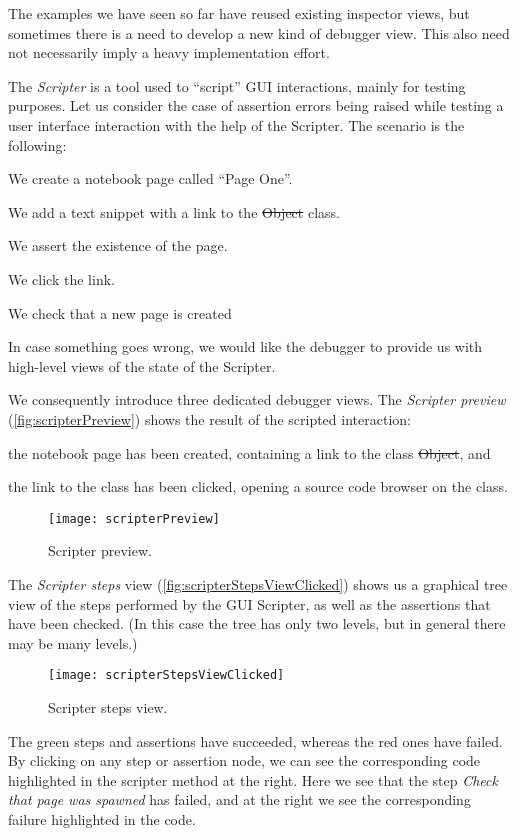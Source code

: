 \documentclass[sigplan,10pt]{acmart}
\newcommand\on[1]{\nbc{ON}{#1}{olive}} %
\newcommand{\GT}{\lst{GT}\xspace} %
\begin{document}
\on{Not sure what is needed.}

The examples we have seen so far have reused existing inspector views, but sometimes there is a need to develop a new kind of debugger view.
This also need not necessarily imply a heavy implementation effort.

The \GT \emph{Scripter} is a tool used to ``script'' GUI interactions, mainly for testing purposes.
Let us consider the case of assertion errors being raised while testing a user interface interaction with the help of the Scripter.
The scenario is the following:
\begin{inparaenum}[(i)]
	\item We create a notebook page called ``Page One''.
	\item We add a text snippet with a link to the \st{Object} class.
	\item We assert the existence of the page.
	\item We click the link.
	\item We check that a new page is created 
	\on{fixed}
\end{inparaenum}
In case something goes wrong, we would like the debugger to provide us with high-level views of the state of the Scripter.

We consequently introduce three dedicated debugger views.
The \emph{Scripter preview} (\autoref{fig:scripterPreview}) shows the result of the scripted interaction:
\begin{inparaenum}[(i)]
	\item the notebook page has been created, containing a link to the class \st{Object}, and
	\item the link to the class has been clicked, opening a source code browser on the class.
\end{inparaenum}
\begin{figure}[h]
  \texttt{[image: scripterPreview]}
  \caption{Scripter preview.}
  \label{fig:scripterPreview}
\end{figure}

The \emph{Scripter steps} view (\autoref{fig:scripterStepsViewClicked}) shows us a graphical tree view of the steps performed by the GUI Scripter, as well as the assertions that have been checked.
(In this case the tree has only two levels, but in general there may be many levels.)
\begin{figure}[h]
  \texttt{[image: scripterStepsViewClicked]}
  \caption{Scripter steps view.}
  \label{fig:scripterStepsViewClicked}
\end{figure}
The green steps and assertions have succeeded, whereas the red ones have failed.
By clicking on any step or assertion node, we can see the corresponding code highlighted in the scripter method at the right.
Here we see that the step \emph{Check that page was spawned} has failed, and at the right we see the corresponding failure highlighted in the code.
\end{document}
